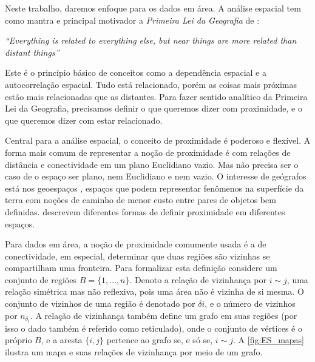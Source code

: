 Neste trabalho, daremos enfoque para os dados em área. A análise espacial tem como mantra e principal motivador a \textit{Primeira Lei da Geografia} de \cite{Tobler1970}:

\begin{center}
    \textit{``Everything is related to everything else, but near things are more related than distant things''}
\end{center}

Este é o princípio básico de conceitos como a dependência espacial e a autocorrelação espacial.
Tudo está relacionado, porém as coisas mais próximas estão mais relacionadas que as distantes.
Para fazer sentido analítico da Primeira Lei da Geografia, precisamos definir o que queremos dizer com proximidade, e o que queremos dizer com estar relacionado. 

Central para a análise espacial, o conceito de proximidade é poderoso e flexível.
A forma mais comum de representar a noção de proximidade é com relações de distância e conectividade em um plano Euclidiano vazio.
Mas não precisa ser o caso de o espaço ser plano, nem Euclidiano e nem vazio.
O interesse de geógrafos está nos geoespaços \cite{Miller2004}, espaços que podem representar fenômenos na superfície da terra com noções de caminho de menor custo entre pares de objetos bem definidas. \cite{Miller2004} \cite{Miller2003} descrevem diferentes formas de definir proximidade em diferentes espaços. 

Para dados em área, a noção de proximidade comumente usada é a de conectividade, em especial, determinar que duas regiões são vizinhas se compartilham uma fronteira.
Para formalizar esta definição considere um conjunto de regiões $B = \{1, \dots, n\}$.
Denoto a relação de vizinhança por $i \sim j$, uma relação simétrica mas não reflexiva, pois uma área não é vizinha de si mesma.
O conjunto de vizinhos de uma região é denotado por $\delta i$, e o número de vizinhos por $n_{\delta_i}$. A relação de vizinhança também define um grafo em suas regiões (por isso o dado também é referido como reticulado), onde o conjunto de vértices é o próprio $B$, e a aresta $\{i,j\}$ pertence ao grafo se, e só se, $i \sim j$.
A \autoref{fig:ES_mapas} ilustra um mapa e suas relações de vizinhança por meio de um grafo.

